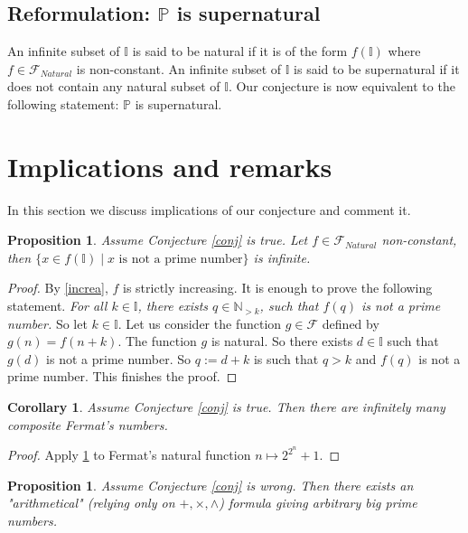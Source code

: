 \documentclass{alggeom}
\newtheorem{prop}[theo]{Proposition}
\newtheorem{coro}[theo]{Corollary}
\newcommand{\N}{\mathbb{N}}
\newcommand{\I}{\mathbb{I}}
\newcommand{\pp}{\mathbb{P}}
\begin{document}
\subsection{Reformulation: $\pp$ is supernatural} 

An infinite subset of $\I$ is said to be natural if it is of the form $f(\I)$ where $f\in \mathscr{F}_{Natural}$ is non-constant. An infinite subset of $\I$ is said to be supernatural if it does not contain any natural subset of $\I$. Our conjecture is now equivalent to the following statement: $\pp$ is supernatural.


\section{Implications and remarks}


In this section we discuss implications of our conjecture and comment it. 



\begin{prop} \label{infini} Assume Conjecture \ref{conj} is true. Let $f \in \mathscr{F} _{Natural}$ non-constant, then $\{ x \in f (\I)  \mid x \text{ is not a prime number} \}$ is infinite.

\end{prop}
\begin{proof}By \ref{increa}, $f$ is strictly increasing. It is enough to prove the following statement. \textit{For all $k \in \I$, there exists $q\in \N _{>k}$, such that $f(q)$ is not a prime number. }
So let $k \in \I$. Let us consider the function $g \in \mathscr{F}  $ defined by $g (n) = f(n+k)$. The function $g$ is natural. So there exists $d \in \I$ such that $g(d)$ is not a prime number. So $q:= d+k$ is such that $q > k$ and $f(q)$ is not a prime number. This finishes the proof.

\end{proof}

\begin{coro} \label{Fermatcor}Assume Conjecture \ref{conj} is true. Then there are infinitely many composite Fermat's numbers.
\end{coro}

\begin{proof}Apply \ref{infini} to Fermat's natural function $n \mapsto 2^{2^n}+1$.

\end{proof}

\begin{prop} \label{incredi} Assume Conjecture \ref{conj} is wrong. Then there exists an "arithmetical" (relying only on $+,\times ,  \wedge$) formula giving arbitrary big prime numbers.

\end{prop}
\end{document}
